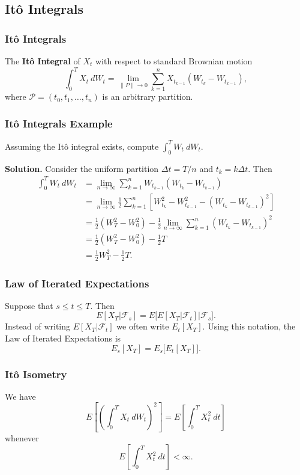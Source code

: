 \documentclass{beamer}
\begin{document}
\subsection{It\^o Integrals}

\begin{frame}
\frametitle{It\^o Integrals}
\begin{Definition}
The {\bf It\^o Integral} of $X_t$ with respect to standard Brownian motion
$$
\int_0^T X_t\ dW_t = \lim_{\| P\|\to 0} \sum_{k = 1}^{n } X_{t_{k - 1}} (W_{t_k} - W_{t_{k - 1}}),
$$
where $\mathcal{P} = (t_0, t_1,\ldots, t_n)$ is an arbitrary partition.
\end{Definition}

\end{frame}

\begin{frame}
\frametitle{It\^o Integrals Example}
\small 
\begin{Example}
Assuming the It\^o integral exists, compute $\int_0^T W_t\ dW_t$.
\end{Example}

{\bf Solution.}
Consider the uniform partition $\Delta t = T/n$ and $t_k = k \Delta t$. Then
\begin{align*}
\int_0^ T W_t\ dW_t 	&= \lim_{n\to\infty}\sum_{k = 1}^n W_{t_{k - 1}} \left(W_{t_k} - W_{t_{k - 1}}\right)\\
				&= \lim_{n\to\infty}\frac{1}{2} \sum_{k = 1}^n \left[ W_{t_k}^2 - W_{t_{k - 1}}^2 - (W_{t_k} - W_{t_{k - 1}})^2\right]\\
				&=  \frac{1}{2} (W_{T}^2 - W_0^2) - \frac{1}{2}\lim_{n\to\infty} \sum_{k = 1}^n (W_{t_k} - W_{t_{k - 1}})^2\\
				&= \frac{1}{2} (W_{T}^2 - W_0^2) - \frac{1}{2}T\\
				&= \frac{1}{2} W_{T}^2 - \frac{1}{2}T.
\end{align*}

\end{frame}

\begin{frame}
\frametitle{Law of Iterated Expectations}
Suppose that $s \leq t \leq T$. Then
$$
E[X_T |\mathcal{F}_s] = E\Big[E[X_T|\mathcal{F}_t] \Big|\mathcal{F}_s\Big].
$$
Instead of writing $E[X_T |\mathcal{F}_t]$ we often write $E_t[X_T]$. Using this notation, the Law of Iterated Expectations is
$$
E_s[X_T] = E_s\Big[E_t[X_T]\Big].
$$
\end{frame}

\begin{frame}
\frametitle{It\^o Isometry}
\begin{Theorem}[It\^o Isometry]
We have
$$
E\left[\left(\int_0^T X_t\ dW_t\right)^2\right] = E\left[\int_0^T X_t^2\ dt\right]
$$
whenever
$$
E\left[\int_0^T X_t^2\ dt\right] < \infty.
$$
\end{Theorem}
\end{frame}
\end{document}
